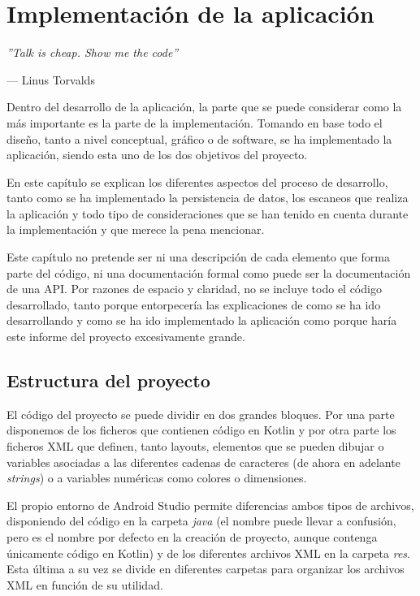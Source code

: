 \chapter{Implementación de la aplicación}

\epigraph{\textit{''Talk is cheap. Show me the code''}}{--- Linus Torvalds}

Dentro del desarrollo de la aplicación, la parte que se puede considerar como la más importante es la parte de la implementación. Tomando en base todo el diseño, tanto a nivel conceptual, gráfico o de software, se ha implementado la aplicación, siendo esta uno de los dos objetivos del proyecto.

En este capítulo se explican los diferentes aspectos del proceso de desarrollo, tanto como se ha implementado la persistencia de datos, los escaneos que realiza la aplicación y todo tipo de consideraciones que se han tenido en cuenta durante la implementación y que merece la pena mencionar.

Este capítulo no pretende ser ni una descripción de cada elemento que forma parte del código, ni una documentación formal como puede ser la documentación de una API. Por razones de espacio y claridad, no se incluye todo el código desarrollado, tanto porque entorpecería las explicaciones de como se ha ido desarrollando y como se ha ido implementado la aplicación como porque haría este informe del proyecto excesivamente grande.

\section{Estructura del proyecto}
El código del proyecto se puede dividir en dos grandes bloques. Por una parte disponemos de los ficheros que contienen código en Kotlin y por otra parte los ficheros XML que definen, tanto layouts, elementos que se pueden dibujar o variables asociadas a las diferentes cadenas de caracteres (de ahora en adelante \textit{strings}) o a variables numéricas como colores o dimensiones.

El propio entorno de Android Studio permite diferencias ambos tipos de archivos, disponiendo del código en la carpeta \textit{java} (el nombre puede llevar a confusión, pero es el nombre por defecto en la creación de proyecto, aunque contenga únicamente código en Kotlin) y de los diferentes archivos XML en la carpeta \textit{res}. Esta última a su vez se divide en diferentes carpetas para organizar los archivos XML en función de su utilidad.


